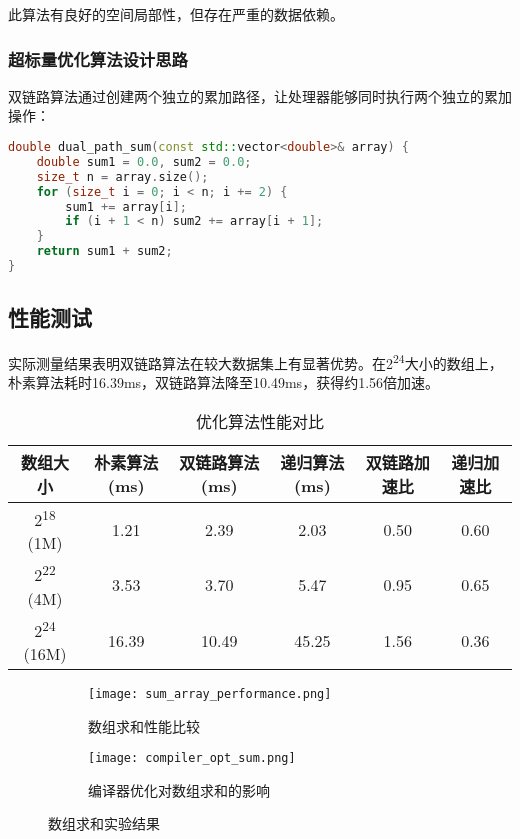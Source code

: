 \documentclass[a4paper,colorlinks=true,linkcolor=blue,urlcolor=blue,citecolor=green,bookmarks=true]{article}
\begin{document}
此算法有良好的空间局部性，但存在严重的数据依赖。

\subsubsection{超标量优化算法设计思路}

双链路算法通过创建两个独立的累加路径，让处理器能够同时执行两个独立的累加操作：

\begin{lstlisting}[language=C++]
double dual_path_sum(const std::vector<double>& array) {
    double sum1 = 0.0, sum2 = 0.0;
    size_t n = array.size();
    for (size_t i = 0; i < n; i += 2) {
        sum1 += array[i];
        if (i + 1 < n) sum2 += array[i + 1];
    }
    return sum1 + sum2;
}
\end{lstlisting}

\subsection{性能测试}

实际测量结果表明双链路算法在较大数据集上有显著优势。在2\textsuperscript{24}大小的数组上，朴素算法耗时16.39ms，双链路算法降至10.49ms，获得约1.56倍加速。

\begin{table}[htbp]
\centering
\caption{优化算法性能对比}
\label{tab:opt_sum_perf}
\begin{tabular}{|c|c|c|c|c|c|}
\hline
\textbf{数组大小} & \textbf{朴素算法(ms)} & \textbf{双链路算法(ms)} & \textbf{递归算法(ms)} & \textbf{双链路加速比} & \textbf{递归加速比} \\
\hline
2\textsuperscript{18} (1M) & 1.21 & 2.39 & 2.03 & 0.50 & 0.60 \\
\hline
2\textsuperscript{22} (4M) & 3.53 & 3.70 & 5.47 & 0.95 & 0.65 \\
\hline
2\textsuperscript{24} (16M) & 16.39 & 10.49 & 45.25 & 1.56 & 0.36 \\
\hline
\end{tabular}
\end{table}

\begin{figure}[htbp]
  \centering
  \begin{subfigure}[b]{0.45\textwidth}
    \centering
    \texttt{[image: sum\_array\_performance.png]}
    \caption{数组求和性能比较}
    \label{fig:sum_array_performance}
  \end{subfigure}
  \hfill
  \begin{subfigure}[b]{0.45\textwidth}
    \centering
    \texttt{[image: compiler\_opt\_sum.png]}
    \caption{编译器优化对数组求和的影响}
    \label{fig:compiler_opt_sum}
  \end{subfigure}
  \caption{数组求和实验结果}
  \label{fig:array_results}
\end{figure}
\end{document}
